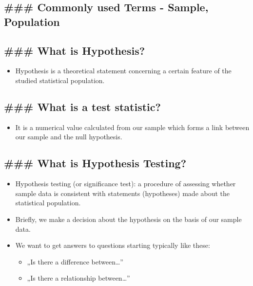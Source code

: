 \documentclass[11pt]{article}
\providecommand{\tightlist}{%
      \setlength{\itemsep}{0pt}\setlength{\parskip}{0pt}}
\begin{document}
    \subsection{\#\#\# Commonly used Terms - Sample,
Population}\label{commonly-used-terms---sample-population}

    

    \subsection{\#\#\# What is Hypothesis?}\label{what-is-hypothesis}

    \begin{itemize}
\tightlist
\item
  Hypothesis is a theoretical statement concerning a certain feature of
  the studied statistical population.
\end{itemize}

    \subsection{\#\#\# What is a test
statistic?}\label{what-is-a-test-statistic}

    \begin{itemize}
\tightlist
\item
  It is a numerical value calculated from our sample which forms a link
  between our sample and the null hypothesis.
\end{itemize}

    \subsection{\#\#\# What is Hypothesis
Testing?}\label{what-is-hypothesis-testing}

    \begin{itemize}
\tightlist
\item
  Hypothesis testing (or significance test): a procedure of assessing
  whether sample data is consistent with statements (hypotheses) made
  about the statistical population.
\item
  Briefly, we make a decision about the hypothesis on the basis of our
  sample data.
\item
  We want to get answers to questions starting typically like these:

  \begin{itemize}
  \tightlist
  \item
    „Is there a difference between\ldots{}''
  \item
    „Is there a relationship between\ldots{}''
  \end{itemize}
\end{itemize}
\end{document}
